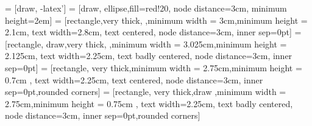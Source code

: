 \usetikzlibrary{shapes.arrows,shapes.geometric,arrows,shadows,automata,positioning,arrows,calc}
\usetikzlibrary{calc}  
 = [draw, -latex']
 = [draw, ellipse,fill=red!20, node distance=3cm,
    minimum height=2em]
\tikzset{>=latex}
 = [rectangle,very thick, ,minimum width = 3cm,minimum height = 2.1cm, text width=2.8cm, text centered, node distance=3cm, inner sep=0pt]
 = [rectangle, draw,very thick, ,minimum width = 3.025cm,minimum height = 2.125cm,    text width=2.25cm, text badly centered, node distance=3cm, inner sep=0pt]
 = [rectangle, very thick,minimum width = 2.75cm,minimum height = 0.7cm ,    text width=2.25cm, text centered, node distance=3cm, inner sep=0pt,rounded corners]
 = [rectangle, very thick,draw ,minimum width = 2.75cm,minimum height = 0.75cm ,    text width=2.25cm, text badly centered, node distance=3cm, inner sep=0pt,rounded corners]
\usetikzlibrary{decorations}
\usetikzlibrary{decorations.pathmorphing}
\usetikzlibrary{patterns}


